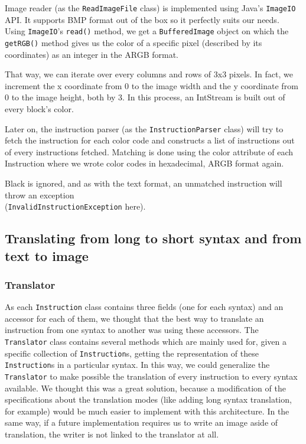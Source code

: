 \documentclass{article}
\begin{document}
Image reader (as the \texttt{ReadImageFile} class) is implemented using Java's \texttt{ImageIO} API. It supports BMP format out of the box so it perfectly suits our needs. Using \texttt{ImageIO}'s \texttt{read()} method, we get a \texttt{BufferedImage} object on which the \texttt{getRGB()} method gives us the color of a specific pixel (described by its coordinates) as an integer in the ARGB format.

That way, we can iterate over every columns and rows of 3x3 pixels. In fact, we increment the x coordinate from 0 to the image width and the y coordinate from 0 to the image height, both by 3. In this process, an IntStream is built out of every block's color.

Later on, the instruction parser (as the \texttt{InstructionParser} class) will try to fetch the instruction for each color code and constructs a list of instructions out of every instructions fetched. Matching is done using the color attribute of each Instruction where we wrote color codes in hexadecimal, ARGB format again.

Black is ignored, and as with the text format, an unmatched instruction will throw an exception \\
(\texttt{InvalidInstructionException} here).

\subsection{Translating from long to short syntax and from text to image}

\subsubsection{Translator}

As each \texttt{Instruction} class contains three fields (one for each syntax) and an accessor for each of them, we thought that the best way to translate an instruction from one syntax to another was using these accessors. The \texttt{Translator} class contains several methods which are mainly used for, given a specific collection of \texttt{Instruction}s, getting the representation of these \texttt{Instruction}s in a particular syntax. In this way, we could generalize the \texttt{Translator} to make possible the translation of every instruction to every syntax available. We thought this was a great solution, because a modification of the specifications about the translation modes (like adding long syntax translation, for example) would be much easier to implement with this architecture. In the same way, if a future implementation requires us to write an image aside of translation, the writer is not linked to the translator at all.
\end{document}
